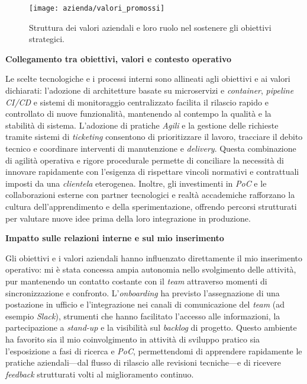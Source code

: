 \begin{figure}[htbp]
    \centering
    \texttt{[image: azienda/valori\_promossi]}
    \caption{Struttura dei valori aziendali e loro ruolo nel sostenere gli obiettivi strategici.}
    \label{fig:valori}
\end{figure}


\medskip
\noindent\textbf{Collegamento tra obiettivi, valori e contesto operativo}

Le scelte tecnologiche e i processi interni sono allineati agli obiettivi e ai valori dichiarati: l'adozione di architetture basate su microservizi e \emph{container},
\emph{pipeline} \emph{CI/CD} e sistemi di monitoraggio centralizzato facilita il rilascio rapido e controllato di nuove funzionalità, mantenendo al contempo la qualità e la stabilità di sistema.
L'adozione di pratiche \emph{Agili} e la gestione delle richieste tramite sistemi di \emph{ticketing} consentono di prioritizzare il lavoro, tracciare il debito tecnico e coordinare interventi
di manutenzione e \emph{delivery}. Questa combinazione di agilità operativa e rigore procedurale permette di conciliare la necessità di innovare rapidamente con l'esigenza di rispettare
vincoli normativi e contrattuali imposti da una \emph{clientela} eterogenea. Inoltre, gli investimenti in \emph{PoC} e le collaborazioni esterne con partner tecnologici e realtà accademiche
rafforzano la cultura dell'apprendimento e della sperimentazione, offrendo percorsi strutturati per valutare nuove idee prima della loro integrazione in produzione.

\medskip
\noindent\textbf{Impatto sulle relazioni interne e sul mio inserimento}

Gli obiettivi e i valori aziendali hanno influenzato direttamente il mio inserimento operativo: mi è stata concessa ampia autonomia nello svolgimento delle attività,
pur mantenendo un contatto costante con il \emph{team} attraverso momenti di sincronizzazione e confronto. L'\emph{onboarding} ha previsto l'assegnazione di una postazione in ufficio e
l'integrazione nei canali di comunicazione del \emph{team} (ad esempio \emph{Slack}), strumenti che hanno facilitato l'accesso alle informazioni, la partecipazione a \emph{stand-up} e la
visibilità sul \emph{backlog} di progetto. Questo ambiente ha favorito sia il mio coinvolgimento in attività di sviluppo pratico sia l'esposizione a fasi di ricerca e \emph{PoC},
permettendomi di apprendere rapidamente le pratiche aziendali—dal flusso di rilascio alle revisioni tecniche—e di ricevere \emph{feedback} strutturati volti al miglioramento continuo.